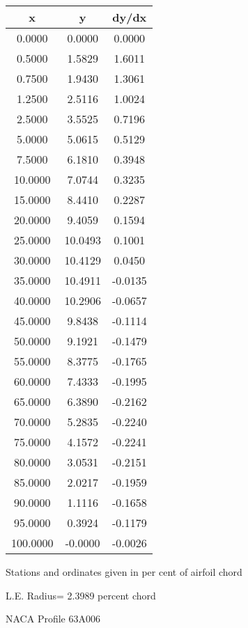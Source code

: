 \documentclass[11pt]{book}
\begin{document}
 \vspace{8mm}
 \begin{tabular}{|c|c|c|} \hline 
  x  &  y  &  dy/dx \\
 \hline
0.0000 & 0.0000 & 0.0000 \\
0.5000 & 1.5829 & 1.6011 \\
0.7500 & 1.9430 & 1.3061 \\
1.2500 & 2.5116 & 1.0024 \\
2.5000 & 3.5525 & 0.7196 \\
5.0000 & 5.0615 & 0.5129 \\
7.5000 & 6.1810 & 0.3948 \\
10.0000 & 7.0744 & 0.3235 \\
15.0000 & 8.4410 & 0.2287 \\
20.0000 & 9.4059 & 0.1594 \\
25.0000 & 10.0493 & 0.1001 \\
30.0000 & 10.4129 & 0.0450 \\
35.0000 & 10.4911 & -0.0135 \\
40.0000 & 10.2906 & -0.0657 \\
45.0000 & 9.8438 & -0.1114 \\
50.0000 & 9.1921 & -0.1479 \\
55.0000 & 8.3775 & -0.1765 \\
60.0000 & 7.4333 & -0.1995 \\
65.0000 & 6.3890 & -0.2162 \\
70.0000 & 5.2835 & -0.2240 \\
75.0000 & 4.1572 & -0.2241 \\
80.0000 & 3.0531 & -0.2151 \\
85.0000 & 2.0217 & -0.1959 \\
90.0000 & 1.1116 & -0.1658 \\
95.0000 & 0.3924 & -0.1179 \\
100.0000 & -0.0000 & -0.0026 \\
 \hline
 \end{tabular}
 \vspace{8mm}


Stations and ordinates given in per cent of airfoil chord 


L.E. Radius=  2.3989 percent chord
 \newpage
  \label{p63A006}
 \begin{Large}
 NACA Profile 63A006
 \end{Large}
  
\end{document}

